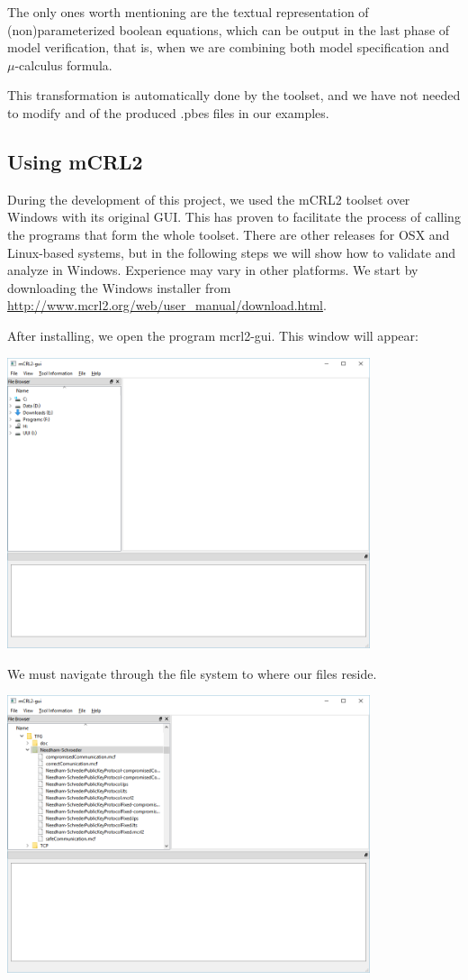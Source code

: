 \documentclass[11pt]{article}
\theoremstyle{definition}
\theoremstyle{plain}
\theoremstyle{definition}
\begin{document}
The only ones worth mentioning are the textual representation of (non)parameterized boolean equations, which can be output in the last phase of model verification, that is, when we are combining both model specification and $ \mu $-calculus formula.

This transformation is automatically done by the toolset, and we have not needed to modify and of the produced .pbes files in our examples.

\subsection{Using mCRL2}

During the development of this project, we used the mCRL2 toolset over Windows with its original GUI. This has proven to facilitate the process of calling the programs that form the whole toolset. There are other releases for OSX and Linux-based systems, but in the following steps we will show how to validate and analyze in Windows. Experience may vary in other platforms. We start by downloading the Windows installer from \href{http://www.mcrl2.org/web/user_manual/download.html}{http://www.mcrl2.org/web/user\_manual/download.html}.

After installing, we open the program mcrl2-gui. This window will appear:

\includegraphics[width=0.8\textwidth, keepaspectratio]{img/mCRL2/mcrl2-intro.png}

We must navigate through the file system to where our files reside.

\includegraphics[width=0.8\textwidth, keepaspectratio]{img/mCRL2/mcrl2-files.png}
\end{document}
